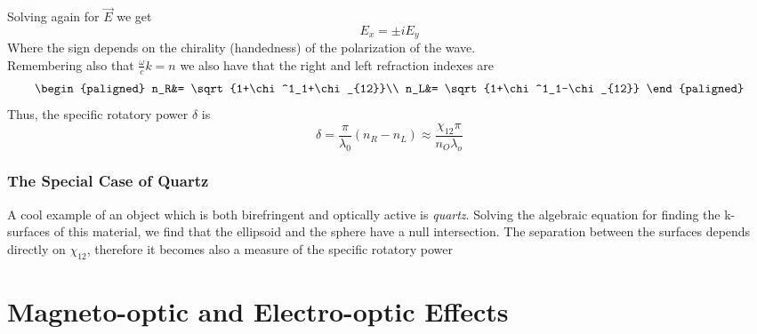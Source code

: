\documentclass[../electromagnetism.tex]{subfiles}
\begin{document}
Solving again for $\vec{E}$ we get 
\begin{equation}
	E_x=\pm iE_y
	\label{eq:rlcpsol.bir}
\end{equation}
Where the sign depends on the chirality (handedness) of the polarization of the wave.\\
Remembering also that $\frac{\omega}{c}k=n$ we also have that the right and left refraction indexes are
\begin{equation}
	\begin{paligned}
		n_R&= \sqrt{1+\chi^1_1+\chi_{12}}\\
		n_L&= \sqrt{1+\chi^1_1-\chi_{12}}
	\end{paligned}
	\label{eq:nrnlopt.bir}
\end{equation}
Thus, the specific rotatory power $\delta$ is
\begin{equation}
	\delta=\frac{\pi}{\lambda_0}\left( n_R-n_L \right)\approx\frac{\chi_{12}\pi}{n_O\lambda_o}
	\label{eq:srpopt.bir}
\end{equation}
\subsubsection{The Special Case of Quartz}
A cool example of an object which is both birefringent and optically active is \textit{quartz}. Solving the algebraic equation for finding the k-surfaces of this material, we find that the ellipsoid and the sphere have a null intersection. The separation between the surfaces depends directly on $\chi_{12}$, therefore it becomes also a measure of the specific rotatory power
\section{Magneto-optic and Electro-optic Effects}
\end{document}
